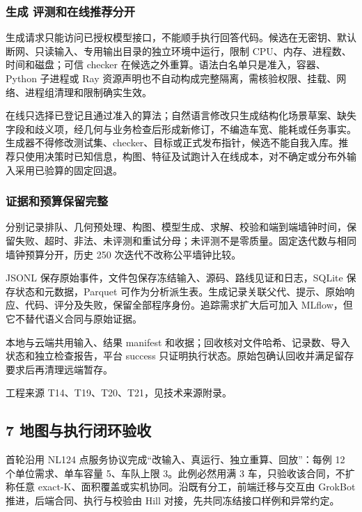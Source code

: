 \documentclass[11pt,a4paper]{article}
\newcommand{\bodytext}[1]{#1\par}
\newcommand{\sourcetext}[1]{{\fontsize{9.2}{14}\selectfont\color{Muted}#1\par}}
\begin{document}
\subsubsection{生成 评测和在线推荐分开}
\bodytext{生成请求只能访问已授权模型接口，不能顺手执行回答代码。候选在无密钥、默认断网、只读输入、专用输出目录的独立环境中运行，限制 CPU、内存、进程数、时间和磁盘；可信 checker 在候选之外重算。语法白名单只是准入，容器、Python 子进程或 Ray 资源声明也不自动构成完整隔离，需核验权限、挂载、网络、进程组清理和限制确实生效。}
\bodytext{在线只选择已登记且通过准入的算法；自然语言修改只生成结构化场景草案、缺失字段和歧义项，经几何与业务检查后形成新修订，不编造车宽、能耗或任务事实。生成器不得修改测试集、checker、目标或正式发布指针，候选不能自我入库。推荐只使用决策时已知信息，构图、特征及试跑计入在线成本，对不确定或分布外输入采用已验算的固定回退。}
\subsubsection{证据和预算保留完整}
\bodytext{分别记录排队、几何预处理、构图、模型生成、求解、校验和端到端墙钟时间，保留失败、超时、非法、未评测和重试分母；未评测不是零质量。固定迭代数与相同墙钟预算分开，历史 250 次迭代不改称公平墙钟比较。}
\bodytext{JSONL 保存原始事件，文件包保存冻结输入、源码、路线见证和日志，SQLite 保存状态和元数据，Parquet 可作为分析派生表。生成记录关联父代、提示、原始响应、代码、评分及失败，保留全部程序身份。追踪需求扩大后可加入 MLflow，但它不替代语义合同与原始证据。}
\bodytext{本地与云端共用输入、结果 manifest 和收据；回收核对文件哈希、记录数、导入状态和独立检查报告，平台 success 只证明执行状态。原始包确认回收并满足留存要求后再清理远端暂存。}
\sourcetext{工程来源 T14、T19、T20、T21，见技术来源附录。}
\subsection{7  地图与执行闭环验收}
\bodytext{首轮沿用 NL124 点服务协议完成“改输入、真运行、独立重算、回放”：每例 12 个单位需求、单车容量 5、车队上限 3。此例必然用满 3 车，只验收该合同，不扩称任意 exact-K、面积覆盖或实机协同。沿既有分工，前端迁移与交互由 GrokBot 推进，后端合同、执行与校验由 Hill 对接，先共同冻结接口样例和异常约定。}
\begingroup
\fontsize{9.6}{14.6}\selectfont
\end{document}
